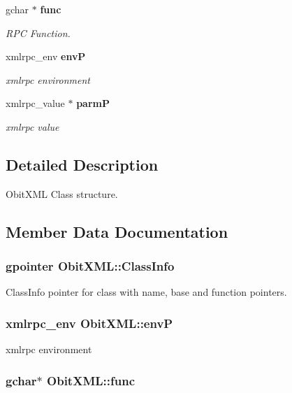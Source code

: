 \begin{CompactItemize}
gchar $\ast$ {\bf func}
\begin{CompactList}\small\item\em RPC Function. \item\end{CompactList}\item 
xmlrpc\_\-env {\bf env\-P}
\begin{CompactList}\small\item\em xmlrpc environment \item\end{CompactList}\item 
xmlrpc\_\-value $\ast$ {\bf parm\-P}
\begin{CompactList}\small\item\em xmlrpc value \item\end{CompactList}\end{CompactItemize}


\subsection{Detailed Description}
Obit\-XML Class structure. 



\subsection{Member Data Documentation}
\subsubsection{\setlength{\rightskip}{0pt plus 5cm}gpointer {\bf Obit\-XML::Class\-Info}}\label{structObitXML_o1}


Class\-Info pointer for class with name, base and function pointers. 

\subsubsection{\setlength{\rightskip}{0pt plus 5cm}xmlrpc\_\-env {\bf Obit\-XML::env\-P}}\label{structObitXML_o7}


xmlrpc environment 

\subsubsection{\setlength{\rightskip}{0pt plus 5cm}gchar$\ast$ {\bf Obit\-XML::func}}\label{structObitXML_o6}


